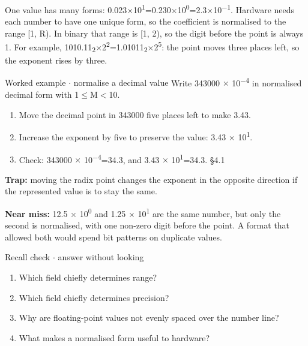\documentclass[11pt]{article}
\begin{document}
\begin{keepsection}
\begin{keepsection}
One value has many forms: 0.023\ensuremath{\times}10\textsuperscript{1}=0.230\ensuremath{\times}10\textsuperscript{0}=2.3\ensuremath{\times}10\textsuperscript{\ensuremath{-}1}. Hardware needs each number to have one unique form, so the coefficient is normalised to the range [1, R). In binary that range is [1, 2), so the digit before the point is always 1. For example, 1010.11\textsubscript{2}\ensuremath{\times}2\textsuperscript{2}=1.01011\textsubscript{2}\ensuremath{\times}2\textsuperscript{5}: the point moves three places left, so the exponent rises by three.

\begin{workedbox}{Worked example \ensuremath{\cdot} normalise a decimal value}
Write 343000 \ensuremath{\times} 10\textsuperscript{\ensuremath{-}4} in normalised decimal form with 1\ensuremath{\leq}M\ensuremath{<}10.

\begin{enumerate}
\item Move the decimal point in 343000 five places left to make 3.43.
\item Increase the exponent by five to preserve the value: 3.43 \ensuremath{\times} 10\textsuperscript{1}.
\item Check: 343000 \ensuremath{\times} 10\textsuperscript{\ensuremath{-}4}=34.3, and 3.43 \ensuremath{\times} 10\textsuperscript{1}=34.3. \hfill{\small\color{FAUblue}§4.1}
\end{enumerate}
\end{workedbox}

\begin{notebox}\textbf{Trap:} moving the radix point changes the exponent in the opposite direction if the represented value is to stay the same.\end{notebox}

\begin{notebox}\textbf{Near miss:} 12.5 \ensuremath{\times} 10\textsuperscript{0} and 1.25 \ensuremath{\times} 10\textsuperscript{1} are the same number, but only the second is normalised, with one non-zero digit before the point. A format that allowed both would spend bit patterns on duplicate values.\end{notebox}

\begin{recallbox}{Recall check \ensuremath{\cdot} answer without looking}
\begin{enumerate}
\item Which field chiefly determines range?
\item Which field chiefly determines precision?
\item Why are floating-point values not evenly spaced over the number line?
\item What makes a normalised form useful to hardware?
\end{enumerate}


\end{recallbox}
\end{keepsection}
\end{keepsection}
\end{document}
